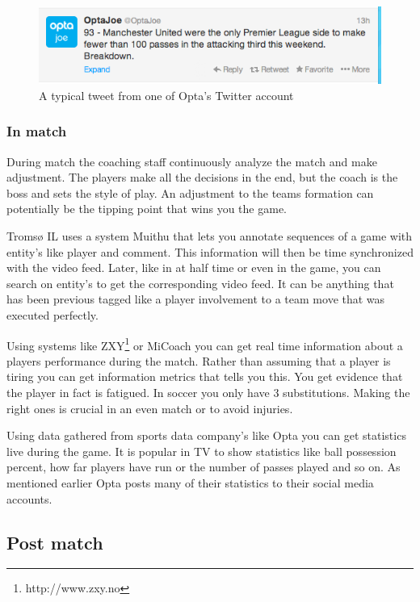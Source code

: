 \begin{figure}[ht!]
\centering
\includegraphics[width=1\textwidth]{images/general/optastats.png}
\caption{A typical tweet from one of Opta's Twitter account}
\label{fig:optastats}
\end{figure}

\subsubsection{In match}

During match the coaching staff continuously analyze the match and make adjustment. The players make all the decisions in the end, but the coach is the boss and sets the style of play. An adjustment to the teams formation can potentially be the tipping point that wins you the game.

Tromsø IL uses a system Muithu \cite{muithu} that lets you annotate sequences of a game with entity's like player and comment. This information will then be time synchronized with the video feed. Later, like in at half time or even in the game, you can search on entity's to get the corresponding video feed. It can be anything that has been previous tagged like a player involvement to a team move that was executed perfectly. 

Using systems like \ac{ZXY}\footnote{http://www.zxy.no} or MiCoach \cite{bigdata:majorleague} you can get real time information about a players performance during the match. Rather than assuming that a player is tiring you can get information metrics that tells you this. You get evidence that the player in fact is fatigued. In soccer you only have 3 substitutions. Making the right ones is crucial in an even match or to avoid injuries.

Using data gathered from sports data company's like Opta you can get statistics live during the game. It is popular in TV to show statistics like ball possession percent, how far players have run or the number of passes played and so on. As mentioned earlier Opta posts many of their statistics to their social media accounts.

\subsection{Post match}

